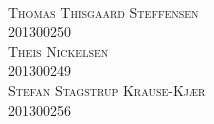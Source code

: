 \begin{titlingpage}
\begin{adjustwidth}{1.0cm}{1.0cm}
{		\vspace*{1\onelineskip}
		\par
		\vspace*{1\onelineskip}
		\par\vspace*{6\onelineskip}
		\Large{}\\
		\vspace*{1\onelineskip}
		\LARGE\textsc{Thomas Thisgaard Steffensen}\\
		\small 201300250\\
		\vspace*{0.1\onelineskip}
		\LARGE\textsc{Theis Nickelsen}\\
		\small 201300249\\
		\vspace*{0.1\onelineskip}
		\LARGE\textsc{Stefan Stagstrup Krause-Kjær}\\
		\small 201300256\\
		

		\vspace*{1\onelineskip}
	}
\end{adjustwidth}
	\vfill
	\large{}\\
	\large{}\hfill
	\\
	\large{}
		

\end{titlingpage}
